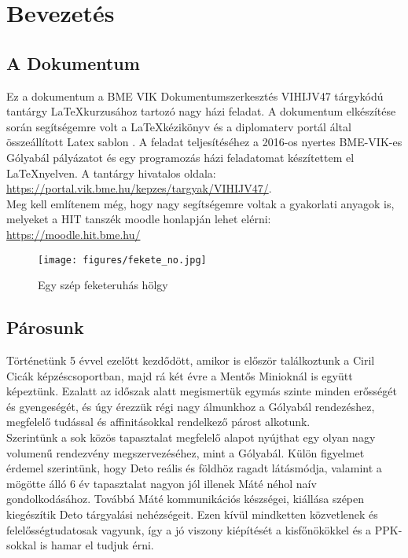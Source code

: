 \chapter{Bevezetés}\label{sect:Intoduction}

\section{A Dokumentum}
\hspace{2mm} Ez a dokumentum a BME VIK Dokumentumszerkesztés VIHIJV47 tárgykódú tantárgy \LaTeX kurzusához tartozó nagy házi feladat. A dokumentum elkészítése során segítségemre volt a \LaTeX kézikönyv \cite{Wettl04} és a diplomaterv portál által összeállított Latex sablon \cite{DipPortal}. A feladat teljesítéséhez a 2016-os nyertes BME-VIK-es Gólyabál pályázatot \cite{GolyaBal} és egy programozás házi feladatomat készítettem el \LaTeX nyelven. A tantárgy hivatalos oldala: \url{https://portal.vik.bme.hu/kepzes/targyak/VIHIJV47/}.\\ 
\indent Meg kell említenem még, hogy nagy segítségemre voltak a gyakorlati anyagok is, melyeket a HIT tanszék moodle honlapján lehet elérni: \url{https://moodle.hit.bme.hu/}

\begin{wrapfigure}{r}{0.5\textwidth} 
\begin{center}
\texttt{[image: figures/fekete\_no.jpg]}
\end{center}
\caption{Egy szép feketeruhás hölgy} 
\label{fig:FeketeNo}
\end{wrapfigure}

\section{Párosunk}
\hspace{2mm} Történetünk 5 évvel ezelőtt kezdődött, amikor is először találkoztunk a Ciril Cicák képzéscsoportban, majd rá két évre a Mentős Minioknál is együtt képeztünk. Ezalatt az időszak alatt megismertük egymás szinte minden erősségét és gyengeségét, és úgy érezzük régi nagy álmunkhoz a Gólyabál rendezéshez, megfelelő tudással és affinitásokkal rendelkező párost alkotunk.\\
\indent Szerintünk a sok közös tapasztalat megfelelő alapot nyújthat egy olyan nagy volumenű rendezvény megszervezéséhez, mint a Gólyabál. Külön figyelmet érdemel szerintünk, hogy Deto reális és földhöz ragadt látásmódja, valamint a mögötte álló 6 év tapasztalat nagyon jól illenek Máté néhol naív gondolkodásához. Továbbá Máté kommunikációs készségei, kiállása szépen kiegészítik Deto tárgyalási nehézségeit. Ezen kívül mindketten közvetlenek és felelősségtudatosak vagyunk, így a jó viszony kiépítését a kisfőnökökkel és a PPK-sokkal is hamar el tudjuk érni.